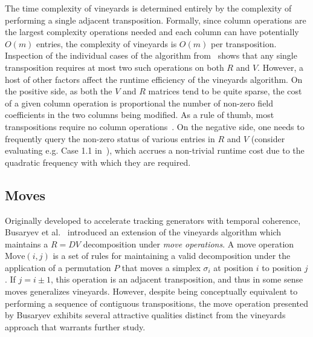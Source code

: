 \documentclass[sn-mathphys]{sn-jnl}
\begin{document}
 The time complexity of vineyards is determined entirely by the complexity of performing a single adjacent transposition.
Formally, since column operations are the largest complexity operations needed and each column can have potentially $O(m)$ entries, the complexity of vineyards is $O(m)$ per transposition. 
Inspection of the individual cases of the algorithm from~\cite{cohen2006vines} shows that any single transposition requires at most two such operations on both $R$ and $V$.
However, a host of other factors affect the runtime efficiency of the vineyards algorithm. 
On the positive side, as both the $V$ and $R$ matrices tend to be quite sparse, the cost of a given column operation is proportional the number of non-zero field coefficients in the two columns being modified. As a rule of thumb, most transpositions require no column operations~\cite{edelsbrunner2000topological}. 
On the negative side, one needs to frequently query the non-zero status of various entries in $R$ and $V$ (consider evaluating e.g. Case 1.1 in~\cite{cohen2006vines}), which accrues a non-trivial runtime cost due to the quadratic frequency with which they are required.   
 

\subsection{Moves}\label{sec:moves} Originally developed to accelerate tracking generators with temporal coherence, Busaryev et al.~\cite{busaryev2010tracking} introduced an extension of the vineyards algorithm which maintains a $R = D V$ decomposition under \emph{move operations}. A move operation $\mathrm{Move}(i,j)$ is a set of rules for maintaining a valid decomposition under the application of a permutation $P$ that moves a simplex $\sigma_i$ at position $i$ to position $j$. If $j = i \pm 1$, this operation is an adjacent transposition, and thus in some sense moves generalizes vineyards.
However, despite being conceptually equivalent to performing a sequence of contiguous transpositions, the move operation presented by Busaryev exhibits several attractive qualities distinct from the vineyards approach that warrants further study.  
\end{document}
